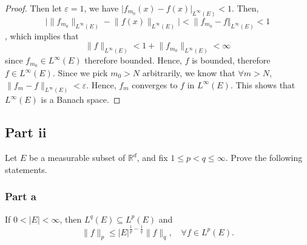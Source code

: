 \begin{answer}
\begin{proof}
        Then let $\varepsilon = 1$, we have $\lvert f_{m_0}(x) - f(x) \rvert_{L^{\infty}(E)} < 1$. Then,
        \begin{equation}
            \lvert \lVert f_{m_0} \rVert_{L^{\infty}(E)} - \lVert f(x) \rVert_{L^{\infty}(E)} \rvert < \lVert f_{m_0} - f \Vert_{L^{\infty}(E)} < 1
        \end{equation}
        , which implies that
        \begin{equation}
            \lVert f \rVert_{L^{\infty}(E)} <  1 + \lVert f_{m_0} \rVert_{L^{\infty}(E)} < \infty
        \end{equation}
        since $f_{m_0} \in L^{\infty}(E)$ therefore bounded. Hence, $f$ is bounded, therefore $f \in L^{\infty}(E)$. Since we pick $m_0 > N$ arbitrarily, we know that $\forall m > N$, $\lVert f_m - f \rVert_{L^{\infty}(E)} < \varepsilon$. Hence, $f_m$ converges to $f$ in $L^{\infty}(E)$. This shows that $L^{\infty}(E)$ is a Banach space.
    \end{proof}
\end{answer}

\subsection{Part ii}

\begin{question}
    Let $E$ be a measurable subset of $\mathbb{R}^d$, and fix $1 \leq p<q \leq \infty$. Prove the following statements.
\end{question}

\subsubsection{Part a}

\begin{question}
    If $0<|E|<\infty$, then $L^q(E) \subseteq L^p(E)$ and
    $$
    \|f\|_p \leq|E|^{\frac{1}{p}-\frac{1}{q}}\|f\|_q, \quad \forall f \in L^p(E) .
    $$
\end{question}

